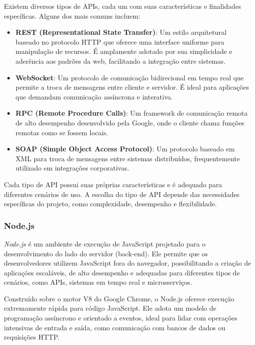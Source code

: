 Existem diversos tipos de APIs, cada um com suas características e finalidades específicas. Alguns dos mais comuns incluem:

\begin{itemize}
    \item \textbf{REST (Representational State Transfer)}: Um estilo arquitetural baseado no protocolo HTTP que oferece uma interface uniforme para manipulação de recursos. É amplamente adotado por sua simplicidade e aderência aos padrões da web, facilitando a integração entre sistemas.
    \item \textbf{WebSocket}: Um protocolo de comunicação bidirecional em tempo real que permite a troca de mensagens entre cliente e servidor. É ideal para aplicações que demandam comunicação assíncrona e interativa.
    \item \textbf{RPC (Remote Procedure Calls)}: Um framework de comunicação remota de alto desempenho desenvolvido pela Google, onde o cliente chama funções remotas como se fossem locais.
    \item \textbf{SOAP (Simple Object Access Protocol)}: Um protocolo baseado em XML para troca de mensagens entre sistemas distribuídos, frequentemente utilizado em integrações corporativas.
\end{itemize}

Cada tipo de API possui suas próprias características e é adequado para diferentes cenários de uso. A escolha do tipo de API depende das necessidades específicas do projeto, como complexidade, desempenho e flexibilidade.


\subsubsection{Node.js}


\emph{Node.js} é um ambiente de execução de JavaScript projetado para o desenvolvimento do lado do servidor (back-end). Ele permite que os desenvolvedores utilizem JavaScript fora do navegador, possibilitando a criação de aplicações escaláveis, de alto desempenho e adequadas para diferentes tipos de cenários, como APIs, sistemas em tempo real e microsserviços.

Construído sobre o motor V8 do Google Chrome, o Node.js oferece execução extremamente rápida para código JavaScript. Ele adota um modelo de programação assíncrono e orientado a eventos\cite{nodejs-about}, ideal para lidar com operações intensivas de entrada e saída, como comunicação com bancos de dados ou requisições HTTP.

